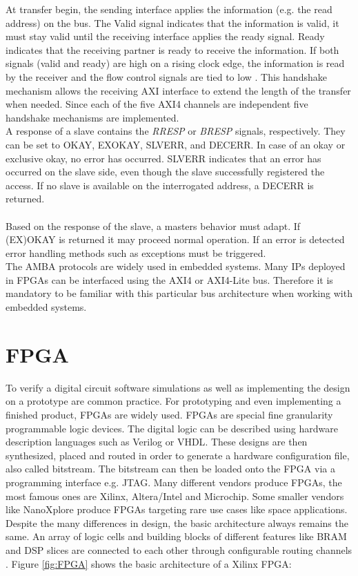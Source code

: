 At transfer begin, the sending interface applies the information (e.g. the read address) on the bus. The Valid signal indicates that the information is valid, it must stay valid until the receiving interface applies the ready signal. Ready indicates that the receiving partner is ready to receive the information. If both signals (valid and ready) are high on a rising clock edge, the information is read by the receiver and the flow control signals are tied to low \cite{AMBA:AXI}. This handshake mechanism allows the receiving \ac{AXI} interface to extend the length of the transfer when needed. Since each of the five \ac{AXI}4 channels are independent five handshake mechanisms are implemented.\\
A response of a slave contains the \textit{RRESP} or \textit{BRESP} signals, respectively. They can be set to OKAY, EXOKAY, SLVERR, and DECERR. In case of an okay or exclusive okay, no error has occurred. SLVERR indicates that an error has occurred on the slave side, even though the slave successfully registered the access. If no slave is available on the interrogated address, a DECERR is returned.\\\\
Based on the response of the slave, a masters behavior must adapt. If (EX)OKAY is returned it may proceed normal operation. If an error is detected error handling methods such as exceptions must be triggered. \\
The \ac{AMBA} protocols are widely used in embedded systems. Many \acp{IP} deployed in \acp{FPGA} can be interfaced using the \ac{AXI}4 or \ac{AXI4-Lite} bus. Therefore it is mandatory to be familiar with this particular bus architecture when working with embedded systems.




\section{FPGA}
To verify a digital circuit software simulations as well as implementing the design on
a prototype are common practice. For prototyping and even implementing a finished
product, \acp{FPGA} are widely used.
\acp{FPGA} are special fine granularity programmable logic devices. The digital logic
can be described using hardware description languages such as Verilog or \ac{VHDL}.
These designs are then synthesized, placed and routed in order to generate a
hardware configuration file, also called bitstream. The bitstream can then be loaded
onto the \ac{FPGA} via a programming interface e.g. \ac{JTAG}.
Many different vendors produce \acp{FPGA}, the most famous ones are Xilinx,
Altera/Intel and Microchip. Some smaller vendors like NanoXplore produce \acp{FPGA}
targeting rare use cases like space applications.
Despite the many differences in design, the basic architecture always
remains the same. An array of logic cells and building blocks of different features
like \ac{BRAM} and \ac{DSP} slices are connected to each other through configurable routing
channels \cite{kesel:2018}.
Figure \ref{fig:FPGA} shows the basic architecture of a Xilinx \ac{FPGA}:\\

